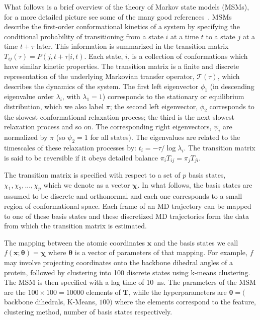 \documentclass[journal=jacsat,manuscript=article]{achemso}
\begin{document}
What follows is a brief overview of the theory of Markov state models (MSMs), for a more detailed picture see some of the many good references~\cite{prinzMarkovModelsMolecular2011, trendelkamp-schroer_estimation_2015,husic_markov_2018}. MSMs describe the first-order conformational kinetics of a system by specifying the conditional probability of transitioning from a state $i$ at a time $t$ to a state $j$ at a time $t+\tau$  later. This information is summarized in the transition matrix $T_{ij}(\tau) = P(j, t+\tau | i, t)$. Each state, $i$, is a collection of conformations which have similar kinetic properties. The transition matrix is a finite and discrete representation of the underlying Markovian transfer operator, $\mathcal{T}(\tau)$, which describes the dynamics of the system. The first left eigenvector $\phi_1$ (in descending eigenvalue order $\lambda_i$, with $\lambda_{1} = 1$) corresponds to the stationary or equilibrium distribution, which we also label $\pi$; the second left eigenvector, $\phi_2$ corresponds to the slowest conformational relaxation process; the third is the next slowest relaxation process and so on. The corresponding right eigenvectors, $\psi_{i}$ are normalized by $\pi$ (so $\psi_{2} = 1$ for all states). The eigenvalues are related to the timescales of these relaxation processes by: $t_{i} = -\tau/\log{\lambda_i}$.  The transition matrix is said to be reversible if it obeys detailed balance $\pi_i T_{ij}=\pi_j T_{ji}$. 

The transition matrix is specified with respect to a set of $p$ basis states, $\chi_1, \chi_2, ..., \chi_p$ which we denote as a vector $\bm{\chi}$. In what follows, the basis states are assumed to be discrete and orthonormal and each one corresponds to a small region of conformational space.  Each frame of an MD trajectory can be mapped to one of these basis states and these discretized MD trajectories form the data from which the transition matrix is estimated.

The mapping between the atomic coordinates $\mathbf{x}$ and the basis states we call $f(\mathbf{x}; \bm{\theta}) =  \bm{\chi}$ where $\bm{\theta}$ is a vector of parameters of that mapping. For example, $f$ may involve projecting coordinates onto the backbone dihedral angles of a protein, followed by clustering into \num{100} discrete states using k-means clustering. The MSM is then specified with a lag time of \SI{10}{\nano\second}. The parameters of the MSM are the $100 \times 100 = 10000$ elements of $\mathbf{T}$, while the hyperparameters are $\bm{\theta}=($backbone dihedrals, K-Means, $100)$ where the elements correspond to the feature, clustering method, number of basis states respectively.  
\end{document}
